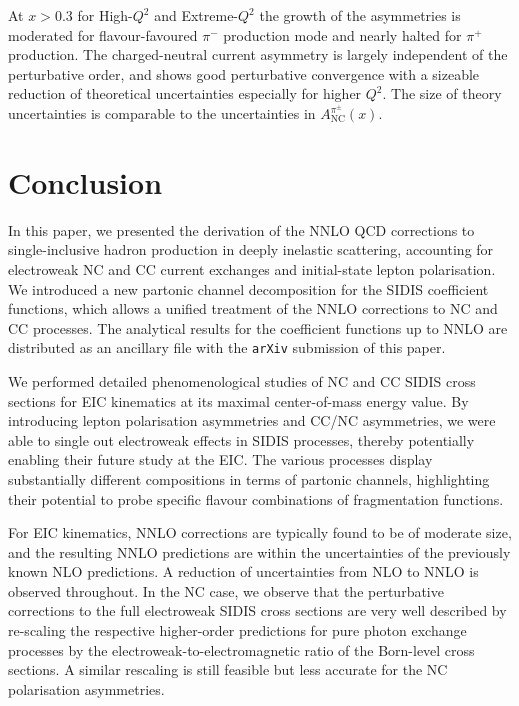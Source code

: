 \documentclass[11pt,a4paper]{article}
\newcommand{\NC}{\mathrm{NC}}
\begin{document}
At $x>0.3$ for High-$Q^2$ and Extreme-$Q^2$ the growth of the asymmetries is moderated for flavour-favoured $\pi^-$ production mode and nearly halted for $\pi^+$ production.
The charged-neutral current asymmetry is largely independent of the perturbative order, and shows good perturbative convergence with a sizeable reduction of theoretical uncertainties especially for higher $Q^2$.
The size of theory uncertainties is comparable to the uncertainties in $A^{\pi^\pm}_\NC(x)$.

\clearpage
\newpage

\section{Conclusion}
\label{sec:conc}

In this paper, we presented the derivation of the
NNLO QCD corrections to single-inclusive hadron production in deeply
inelastic scattering, accounting for electroweak NC and CC current exchanges and initial-state lepton polarisation.
We introduced a new partonic channel decomposition for the SIDIS coefficient functions, which allows a
unified treatment of the NNLO corrections to NC and CC processes.
The
analytical results for the coefficient functions up to NNLO
are distributed as an ancillary file with the \texttt{arXiv} submission of this paper.

We performed detailed phenomenological studies
of NC and CC SIDIS cross sections for EIC kinematics at its
maximal center-of-mass energy value. By introducing lepton polarisation asymmetries and
CC/NC asymmetries, we were able to single out electroweak effects in SIDIS processes, thereby
potentially enabling their future study at the EIC.
The various processes display substantially different
compositions in terms of partonic channels, highlighting their potential to probe specific flavour combinations of fragmentation functions.

For EIC kinematics, NNLO corrections are typically found to be of moderate size, and the resulting NNLO predictions are
within the uncertainties of the previously known NLO predictions. A reduction of uncertainties from NLO to NNLO is
observed throughout.
In the NC case, we observe that the perturbative corrections to the
full electroweak SIDIS cross sections are very well described by re-scaling the respective higher-order predictions
for pure photon exchange processes by the electroweak-to-electromagnetic ratio of the Born-level cross sections.
A similar rescaling is still feasible but less accurate for the NC polarisation asymmetries.
\end{document}
